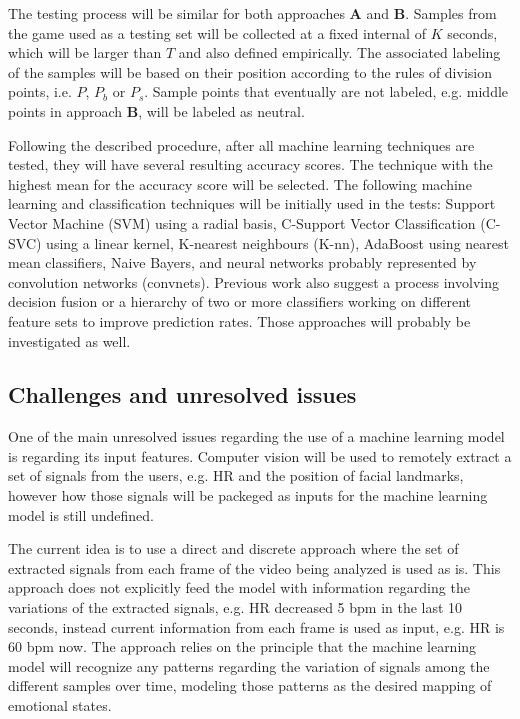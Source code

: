 The testing process will be similar for both approaches \textbf{A} and \textbf{B}. Samples from the game used as a testing set will be collected at a fixed internal of $K$ seconds, which will be larger than $T$ and also defined empirically. The associated labeling of the samples will be based on their position according to the rules of division points, i.e. $P$, $P_b$ or $P_s$. Sample points that eventually are not labeled, e.g. middle points in approach \textbf{B}, will be labeled as neutral.

Following the described procedure, after all machine learning techniques are tested, they will have several resulting accuracy scores. The technique with the highest mean for the accuracy score will be selected. The following machine learning and classification techniques will be initially used in the tests: Support Vector Machine (SVM) using a radial basis, C-Support Vector Classification (C-SVC) using a linear kernel, K-nearest neighbours (K-nn), AdaBoost using nearest mean classifiers, Naive Bayers, and neural networks probably represented by convolution networks (convnets). Previous work also suggest a process involving decision fusion or a hierarchy of two or more classifiers working on different feature sets to improve prediction rates. Those approaches will probably be investigated as well.

\subsection{Challenges and unresolved issues}

One of the main unresolved issues regarding the use of a machine learning model is regarding its input features. Computer vision will be used to remotely extract a set of signals from the users, e.g. HR and the position of facial landmarks, however how those signals will be packeged as inputs for the machine learning model is still undefined.

The current idea is to use a direct and discrete approach where the set of extracted signals from each frame of the video being analyzed is used as is. This approach does not explicitly feed the model with information regarding the variations of the extracted signals, e.g. HR decreased 5 bpm in the last 10 seconds, instead current information from each frame is used as input, e.g. HR is 60 bpm now. The approach relies on the principle that the machine learning model will recognize any patterns regarding the variation of signals among the different samples over time, modeling those patterns as the desired mapping of emotional states.

